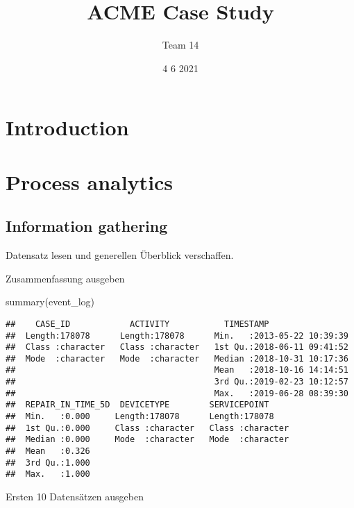 \documentclass[
]{article}
\title{ACME Case Study}
\author{Team 14}
\date{4 6 2021}
\newenvironment{Shaded}{\begin{snugshade}}{\end{snugshade}}
\newcommand{\FunctionTok}[1]{\textcolor[rgb]{0.00,0.00,0.00}{#1}}
\newcommand{\NormalTok}[1]{#1}
\begin{document}
\maketitle

\hypertarget{introduction}{%
\section{Introduction}\label{introduction}}

\hypertarget{process-analytics}{%
\section{Process analytics}\label{process-analytics}}

\hypertarget{information-gathering}{%
\subsection{Information gathering}\label{information-gathering}}

Datensatz lesen und generellen Überblick verschaffen.

Zusammenfassung ausgeben

\begin{Shaded}
\begin{Highlighting}[]
\FunctionTok{summary}\NormalTok{(event\_log)}
\end{Highlighting}
\end{Shaded}

\begin{verbatim}
##    CASE_ID            ACTIVITY           TIMESTAMP                  
##  Length:178078      Length:178078      Min.   :2013-05-22 10:39:39  
##  Class :character   Class :character   1st Qu.:2018-06-11 09:41:52  
##  Mode  :character   Mode  :character   Median :2018-10-31 10:17:36  
##                                        Mean   :2018-10-16 14:14:51  
##                                        3rd Qu.:2019-02-23 10:12:57  
##                                        Max.   :2019-06-28 08:39:30  
##  REPAIR_IN_TIME_5D  DEVICETYPE        SERVICEPOINT      
##  Min.   :0.000     Length:178078      Length:178078     
##  1st Qu.:0.000     Class :character   Class :character  
##  Median :0.000     Mode  :character   Mode  :character  
##  Mean   :0.326                                          
##  3rd Qu.:1.000                                          
##  Max.   :1.000
\end{verbatim}

Ersten 10 Datensätzen ausgeben
\end{document}
